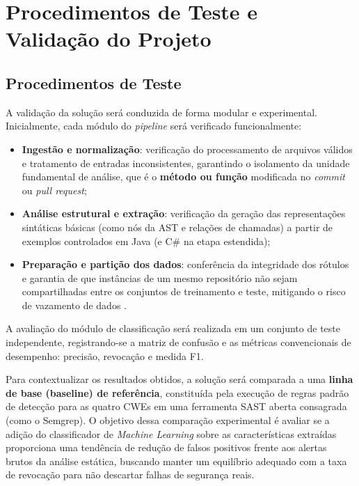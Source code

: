 \chapter{Procedimentos de Teste e Validação do Projeto}
\label{cap:testes}


\section{Procedimentos de Teste}

A validação da solução será conduzida de forma modular e experimental. Inicialmente, cada módulo do \textit{pipeline} será verificado funcionalmente:
\begin{itemize}
    \item \textbf{Ingestão e normalização}: verificação do processamento de arquivos válidos e tratamento de entradas inconsistentes, garantindo o isolamento da unidade fundamental de análise, que é o \textbf{método ou função} modificada no \textit{commit} ou \textit{pull request};
    \item \textbf{Análise estrutural e extração}: verificação da geração das representações sintáticas básicas (como nós da AST e relações de chamadas) a partir de exemplos controlados em Java (e C\# na etapa estendida);
    \item \textbf{Preparação e partição dos dados}: conferência da integridade dos rótulos e garantia de que instâncias de um mesmo repositório não sejam compartilhadas entre os conjuntos de treinamento e teste, mitigando o risco de vazamento de dados \cite{ding2024primevul}.
\end{itemize}

A avaliação do módulo de classificação será realizada em um conjunto de teste independente, registrando-se a matriz de confusão e as métricas convencionais de desempenho: precisão, revocação e medida F1. 

Para contextualizar os resultados obtidos, a solução será comparada a uma \textbf{linha de base (baseline) de referência}, constituída pela execução de regras padrão de detecção para as quatro CWEs em uma ferramenta SAST aberta consagrada (como o Semgrep). O objetivo dessa comparação experimental é avaliar se a adição do classificador de \textit{Machine Learning} sobre as características extraídas proporciona uma tendência de redução de falsos positivos frente aos alertas brutos da análise estática, buscando manter um equilíbrio adequado com a taxa de revocação para não descartar falhas de segurança reais.

